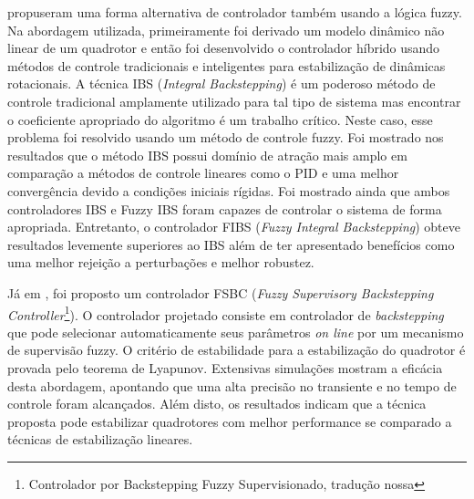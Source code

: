  propuseram uma forma alternativa de controlador também usando a lógica fuzzy. Na abordagem utilizada, primeiramente foi derivado um modelo dinâmico não linear de um quadrotor e então foi desenvolvido o controlador híbrido usando métodos de controle tradicionais e inteligentes para estabilização de dinâmicas rotacionais. A técnica IBS (\textit{Integral Backstepping}) é um poderoso método de controle tradicional amplamente utilizado para tal tipo de sistema mas encontrar o coeficiente apropriado do algoritmo é um trabalho crítico. Neste caso, esse problema foi resolvido usando um método de controle fuzzy. Foi mostrado nos resultados que o método IBS possui domínio de atração mais amplo em comparação a métodos de controle lineares como o PID e uma melhor convergência devido a condições iniciais rígidas. Foi mostrado ainda que ambos controladores IBS e Fuzzy IBS foram capazes de controlar o sistema de forma apropriada. Entretanto, o controlador FIBS (\textit{Fuzzy Integral Backstepping}) obteve resultados levemente superiores ao IBS além de ter apresentado benefícios como uma melhor rejeição a perturbações e melhor robustez.

Já em \cite{Ariffanan2014}, foi proposto um controlador FSBC (\textit{Fuzzy Supervisory Backstepping Controller}\footnote{Controlador por Backstepping Fuzzy Supervisionado, tradução nossa}). O controlador projetado consiste em controlador de \textit{backstepping} que pode selecionar automaticamente seus parâmetros \textit{on line} por um mecanismo de supervisão fuzzy. O critério de estabilidade para a estabilização do quadrotor é provada pelo teorema de Lyapunov. Extensivas simulações mostram a eficácia desta abordagem, apontando que uma alta precisão no transiente e no tempo de controle foram alcançados. Além disto, os resultados indicam que a técnica proposta pode estabilizar quadrotores com melhor performance se comparado a técnicas de estabilização lineares.

